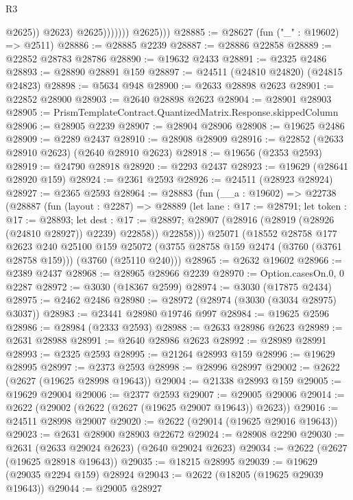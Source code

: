 \begin{lexlean}{R3}
\begin{coremodule}
                              @2625))
                          @2623)
                        @2625)))))))
          @2625)))
@28885 := @28627 (fun ("_" : @19602) => @2511)
@28886 := @28885 @2239
@28887 := @28886 @22858
@28889 := @22852 @28783 @28786
@28890 := @19632 @2433
@28891 := @2325 @2486
@28893 := @28890 @28891 @159
@28897 := @24511 (@24810 @24820) (@24815 @24823)
@28898 := @5634 @948
@28900 := @2633 @28898 @2623
@28901 := @22852 @28900
@28903 := @2640 @28898 @2623
@28904 := @28901 @28903
@28905 := PrismTemplateContract.QuantizedMatrix.Response.skippedColumn
@28906 := @28905 @2239
@28907 := @28904 @28906
@28908 := @19625 @2486
@28909 := @2289 @2437
@28910 := @28908 @28909
@28916 := @22852 (@2633 @28910 @2623) (@2640 @28910 @2623)
@28918 := @19656 (@2353 @2593)
@28919 := @24790 @28918
@28920 := @2293 @2437
@28923 := @19629 (@28641 @28920 @159)
@28924 := @2361 @2593
@28926 := @24511 (@28923 @28924)
@28927 := @2365 @2593
@28964 := @28883
    (fun (__a : @19602) =>
    @22738
      (@28887
        (fun (layout : @2287) =>
        @28889
          (let lane : @17 := @28791;
          let token : @17 := @28893;
          let dest : @17 := @28897; @28907 (@28916 (@28919 (@28926 (@24810 @28927)) @2239) @22858))
          @22858)))
    @25071
    (@18552
      @28758
      @177
      @2623
      @240
      @25100
      @159
      @25072
      (@3755 @28758 @159 @2474 (@3760 (@3761 @28758 @159)))
      (@3760 (@25110 @240)))
@28965 := @2632 @19602
@28966 := @2389 @2437
@28968 := @28965 @28966 @2239
@28970 := Option.casesOn.{0, 0} @2287
@28972 := @3030 (@18367 @2599)
@28974 := @3030 (@17875 @2434)
@28975 := @2462 @2486
@28980 := @28972 (@28974 (@3030 (@3034 @28975) @3037))
@28983 := @23441 @28980 @19746 @997
@28984 := @19625 @2596
@28986 := @28984 (@2333 @2593)
@28988 := @2633 @28986 @2623
@28989 := @2631 @28988
@28991 := @2640 @28986 @2623
@28992 := @28989 @28991
@28993 := @2325 @2593
@28995 := @21264 @28993 @159
@28996 := @19629 @28995
@28997 := @2373 @2593
@28998 := @28996 @28997
@29002 := @2622 (@2627 (@19625 @28998 @19643))
@29004 := @21338 @28993 @159
@29005 := @19629 @29004
@29006 := @2377 @2593
@29007 := @29005 @29006
@29014 := @2622 (@29002 (@2622 (@2627 (@19625 @29007 @19643)) @2623))
@29016 := @24511 @28998 @29007
@29020 := @2622 (@29014 (@19625 @29016 @19643))
@29023 := @2631 @28900 @28903 @22672
@29024 := @28908 @2290
@29030 := @2631 (@2633 @29024 @2623) (@2640 @29024 @2623)
@29034 := @2622 (@2627 (@19625 @28918 @19643))
@29035 := @18215 @28995
@29039 := @19629 (@29035 @2294 @159) @28924
@29043 := @2622 (@18205 (@19625 @29039 @19643))
@29044 := @29005 @28927

\end{coremodule}
\end{lexlean}
